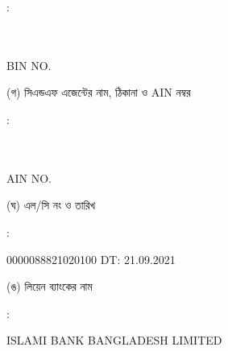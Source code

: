 \documentclass[12pt]{article}
\newcommand{\lcno}{0000088821020100}
\newcommand{\lcdt}{21.09.2021}
\newcommand{\lienbank}{ISLAMI BANK BANGLADESH LIMITED}
\newcommand{\impn}{\jeal}
\newcommand{\impadd}{\jeala}
\newcommand{\impbin}{\jealbin}
\begin{document}
\begin{minipage}[t]{0.02\linewidth}
:
\end{minipage}
\begin{minipage}[t]{0.53\linewidth}
\textbf{{\impn}}
\\
{\impadd}
\\
BIN NO. {\impbin}
\\
\end{minipage}
\begin{minipage}[t]{0.05\linewidth}
\hspace*{1em}
\end{minipage}
\begin{minipage}[t]{0.40\linewidth}
(গ) সিএন্ডএফ এজেন্টের নাম, ঠিকানা
ও AIN নম্বর
\end{minipage}
\begin{minipage}[t]{0.02\linewidth}
:
\end{minipage}
\begin{minipage}[t]{0.53\linewidth}
\textbf{{\cnfn}}
\\
{\cnfadd}
\\
AIN NO. {\cnfain}
\\
\end{minipage}
\begin{minipage}[t]{0.05\linewidth}
\hspace*{1em}
\end{minipage}
\begin{minipage}[t]{0.40\linewidth}
(ঘ) এল/সি নং ও তারিখ
\end{minipage}
\begin{minipage}[t]{0.02\linewidth}
:
\end{minipage}
\begin{minipage}[t]{0.53\linewidth}
{\lcno} \hspace{2em} DT: {\lcdt}
\\
\end{minipage}
\begin{minipage}[t]{0.05\linewidth}
\hspace*{1em}
\end{minipage}
\begin{minipage}[t]{0.40\linewidth}
(ঙ) লিয়েন ব্যাংকের নাম
\end{minipage}
\begin{minipage}[t]{0.02\linewidth}
:
\end{minipage}
\begin{minipage}[t]{0.53\linewidth}
{\lienbank}
\\
\end{minipage}
\end{document}
